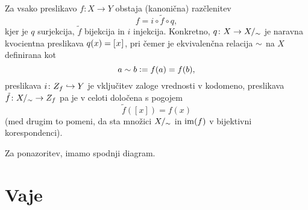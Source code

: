                 \begin{izrek}
                        Za vsako preslikavo $f\colon X \to Y$ obstaja (kanonična) razčlenitev
                        \[f = i \circ \tilde{f} \circ q,\]
                        kjer je $q$ surjekcija, $\tilde{f}$ bijekcija in $i$ injekcija. Konkretno, $q\colon X \to X/_\sim$ je naravna kvocientna preslikava $q(x) = [\:\!{x}\:\!]_{}$, pri čemer je ekvivalenčna relacija $\sim$ na $X$ definirana kot
                        \[a \sim b \mathrel{\mathop:}= f(a) = f(b),\]
                        preslikava $i\colon Z_{f} \hookrightarrow Y$ je vključitev zaloge vrednosti v kodomeno, preslikava $\tilde{f}\colon X/_\sim \to Z_{f}$ pa je v celoti določena s pogojem
                        \[\tilde{f}([x]) = f(x)\]
                        (med drugim to pomeni, da sta množici $X/_\sim$ in $\mathrm{im}(f)$ v bijektivni korespondenci). 

                        Za ponazoritev, imamo spodnji diagram.

                \end{izrek}

                \begin{dokaz}
                \end{dokaz}


\section{Vaje}


